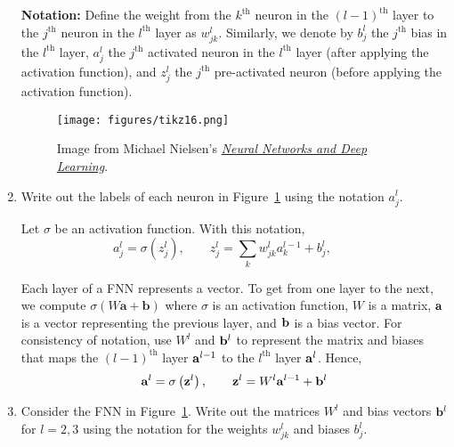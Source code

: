 \documentclass[12pt]{amsart}
\theoremstyle{definition}
\begin{document}
\begin{enumerate}[itemsep=2.5em,leftmargin=0pt]
\noindent \textbf{Notation:} Define the weight from the $k^{\text{th}}$ neuron in the $(l-1)^{\text{th}}$ layer to the $j^{\text{th}}$ neuron in the $l^{\text{th}}$ layer as $w^l_{jk}$. Similarly, we denote by $b^l_j$ the $j^{\text{th}}$ bias in the $l^{\text{th}}$ layer, $a^l_j$ the $j^{\text{th}}$ activated neuron in the $l^{\text{th}}$ layer (after applying the activation function), and $z^l_j$ the $j^{\text{th}}$ pre-activated neuron (before applying the activation function).
\begin{figure}[h!]
    \centering
    \texttt{[image: figures/tikz16.png]}
    \caption{Image from Michael Nielsen's \href{http://neuralnetworksanddeeplearning.com/index.html}{\textit{Neural Networks and Deep Learning}}.}
    \label{fig:weight-notation}
\end{figure}

\vspace{-1.5em}

\item Write out the labels of each neuron in Figure~\ref{fig:weight-notation} using the notation $a^l_j$.

\vspace{2.5em}

\noindent Let $\sigma$ be an activation function. With this notation,
\begin{equation}\label{eq:neuron}
    a^l_j = \sigma\left( z^l_j \right), \qquad 
    z^l_j = \sum_k w^l_{jk}a^{l-1}_k +b^l_j, \qquad
\end{equation}

\noindent Each layer of a FNN represents a vector. To get from one layer to the next, we compute $\sigma(W\mathbf{a}+\mathbf{b})$ where $\sigma$ is an activation function, $W$ is a matrix, $\bf a$ is a vector representing the previous layer, and $\bf b$ is a bias vector. For consistency of notation, use $W^l$ and ${\bf b}^l$ to represent the matrix and biases that maps the $(l-1)^{\text{th}}$ layer ${\bf a}^{l-1}$ to the $l^{\text{th}}$ layer ${\bf a}^l$. Hence,
\begin{equation}\label{eq:layer}
    {\bf a}^l = \sigma\left( {\bf z}^l \right), \qquad
    {\bf z}^l = W^{l} {\bf a}^{l-1} + {\bf b}^{l}
\end{equation}

\vspace{-1.5em}

\item Consider the FNN in Figure~\ref{fig:weight-notation}. Write out the matrices $W^l$ and bias vectors ${\bf b}^l$ for $l=2,3$ using the notation for the weights $w^l_{jk}$ and biases $b^l_j$.


\end{enumerate}
\end{document}

